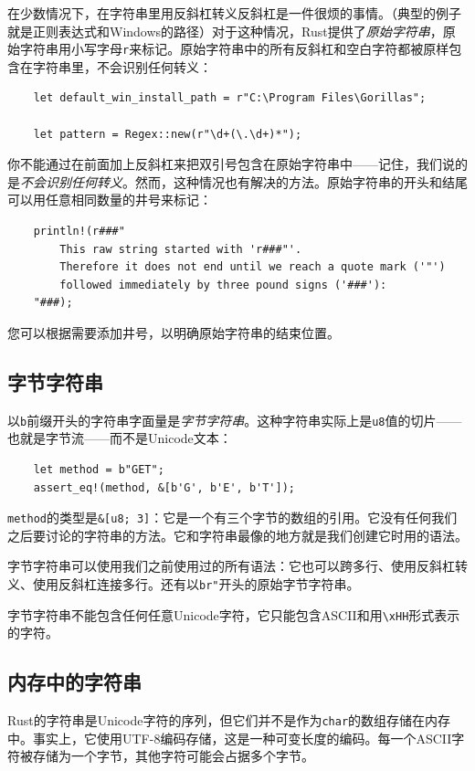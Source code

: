 在少数情况下，在字符串里用反斜杠转义反斜杠是一件很烦的事情。（典型的例子就是正则表达式和Windows的路径）对于这种情况，Rust提供了\emph{原始字符串}，原始字符串用小写字母\texttt{r}来标记。原始字符串中的所有反斜杠和空白字符都被原样包含在字符串里，不会识别任何转义：
\begin{verbatim}
    let default_win_install_path = r"C:\Program Files\Gorillas";

    let pattern = Regex::new(r"\d+(\.\d+)*");
\end{verbatim}

你不能通过在前面加上反斜杠来把双引号包含在原始字符串中——记住，我们说的是\emph{不会识别任何转义}。然而，这种情况也有解决的方法。原始字符串的开头和结尾可以用任意相同数量的井号来标记：
\begin{verbatim}
    println!(r###"
        This raw string started with 'r###"'.
        Therefore it does not end until we reach a quote mark ('"')
        followed immediately by three pound signs ('###'):
    "###);
\end{verbatim}

您可以根据需要添加井号，以明确原始字符串的结束位置。

\subsection{字节字符串}

以\texttt{b}前缀开头的字符串字面量是\emph{字节字符串}。这种字符串实际上是\texttt{u8}值的切片——也就是字节流——而不是Unicode文本：
\begin{verbatim}
    let method = b"GET";
    assert_eq!(method, &[b'G', b'E', b'T']);
\end{verbatim}

\texttt{method}的类型是\texttt{\&[u8; 3]}：它是一个有三个字节的数组的引用。它没有任何我们之后要讨论的字符串的方法。它和字符串最像的地方就是我们创建它时用的语法。

字节字符串可以使用我们之前使用过的所有语法：它也可以跨多行、使用反斜杠转义、使用反斜杠连接多行。还有以\texttt{br"}开头的原始字节字符串。

字节字符串不能包含任何任意Unicode字符，它只能包含ASCII和用\texttt{\textbackslash xHH}形式表示的字符。

\subsection{内存中的字符串}

Rust的字符串是Unicode字符的序列，但它们并不是作为\texttt{char}的数组存储在内存中。事实上，它使用UTF-8编码存储，这是一种可变长度的编码。每一个ASCII字符被存储为一个字节，其他字符可能会占据多个字节。

